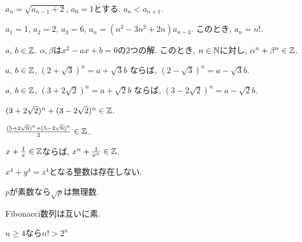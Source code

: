 \begin{prop}
  $a_n=\sqrt{a_{n-1}+2}$, $a_0=1$とする.
  $a_n<a_{n+1}$.
\end{prop}



\begin{prop}
  $a_1=1$, $a_2=2$, $a_3=6$,
  $a_n=(n^3-3n^2+2n)a_{n-3}$.
  このとき, $a_n=n!$.
\end{prop}



\begin{prop}
  $a$, $b\in\mathbb{Z}$.
  $\alpha, \beta$は$x^2-ax+b=0$の2つの解.
  このとき, $n\in\mathbb{N}$に対し,
  $\alpha^n+\beta^n\in \mathbb{Z}$.
\end{prop}

\begin{prop}
  $a$, $b\in\mathbb{Z}$,  
  $(2+\sqrt{3})^n=a+\sqrt{3}b$
  ならば,
  $(2-\sqrt{3})^n=a-\sqrt{3}b$.
\end{prop}

\begin{prop}
  $a$, $b\in\mathbb{Z}$,  
  $(3+2\sqrt{2})^n=a+\sqrt{2}b$
  ならば,
  $(3-2\sqrt{2})^n=a-\sqrt{2}b$.
\end{prop}


\begin{prop}
  $(3+2\sqrt{2})^n+(3-2\sqrt{2})^n\in\mathbb{Z}$.
\end{prop}

\begin{prop}
  $\frac{(5+2\sqrt{6})^n+(5-2\sqrt{6})^n}{2}\in\mathbb{Z}$.
\end{prop}

\begin{prop}
  $x+\frac{1}{x}\in\mathbb{Z}$ならば, 
  $x^n+\frac{1}{x^n}\in\mathbb{Z}$.
\end{prop}


\begin{prop}
  $x^4+y^4=z^4$となる整数は存在しない.
\end{prop}

\begin{prop}
  $p$が素数なら$\sqrt{p}$は無理数.
\end{prop}

\begin{prop}
  Fibonacci数列は互いに素.
\end{prop}



\begin{prop}
  $n\geq 4$なら$n!>2^n$
\end{prop}



